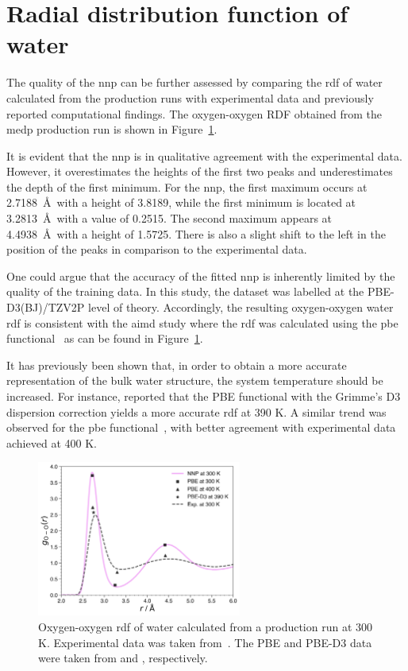 \section{Radial distribution function of water} \label{sec:water_rdf}

The quality of the \ac{nnp} can be further assessed by comparing the \ac{rdf} of water calculated from the production runs with experimental data and previously reported computational findings. The oxygen-oxygen RDF obtained from the \ac{medp} production run is shown in Figure~\ref{fig:water_rdf}.

It is evident that the \ac{nnp} is in qualitative agreement with the experimental data. However, it overestimates the heights of the first two peaks and underestimates the depth of the first minimum. For the \ac{nnp}, the first maximum occurs at 2.7188~\AA\ with a height of 3.8189, while the first minimum is located at 3.2813~\AA\ with a value of 0.2515. The second maximum appears at 4.4938~\AA\ with a height of 1.5725. There is also a slight shift to the left in the position of the peaks in comparison to the experimental data.

One could argue that the accuracy of the fitted \ac{nnp} is inherently limited by the quality of the training data. In this study, the dataset was labelled at the PBE-D3(BJ)/TZV2P level of theory. Accordingly, the resulting oxygen-oxygen water \ac{rdf} is consistent with the \ac{aimd} study where the \ac{rdf} was calculated using the \ac{pbe} functional~\citep{phamStructureDynamicsAqueous2016} as can be found in Figure~\ref{fig:water_rdf}.

It has previously been shown that, in order to obtain a more accurate representation of the bulk water structure, the system temperature should be increased. For instance, \citep{zhouQuantifyingStructureWater2022} reported that the PBE functional with the Grimme's D3 dispersion correction yields a more accurate \ac{rdf} at 390 K. A similar trend was observed for the \ac{pbe} functional~\citep{phamStructureDynamicsAqueous2016}, with better agreement with experimental data achieved at 400 K.

\begin{figure}[t!]
    \centering
    \includegraphics[width=0.6\textwidth]{Figures/4_Results/results_water_rdf.png}
    \caption{Oxygen-oxygen \ac{rdf} of water calculated from a production run at 300 K. Experimental data was taken from~\citep{soperRadialDistributionFunctions2013}. The PBE and PBE-D3 data were taken from \citep{phamStructureDynamicsAqueous2016} and \citep{zhouQuantifyingStructureWater2022}, respectively.}
    \label{fig:water_rdf}
\end{figure}

